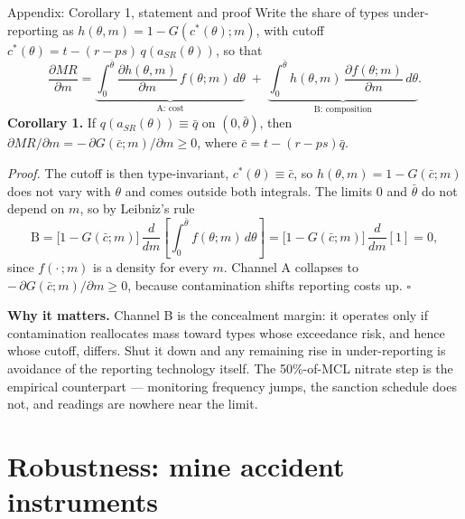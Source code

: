 \documentclass{beamer}
\begin{document}
\begin{frame}{Appendix: Corollary 1, statement and proof}
\scriptsize
Write the share of types under-reporting as $h(\theta,m) = 1 - G(c^*(\theta);m)$, with cutoff $c^*(\theta) = t - (r-ps)\,q(a_{SR}(\theta))$, so that
\[
\frac{\partial MR}{\partial m} = \underbrace{\int_0^{\bar\theta}\!\frac{\partial h(\theta,m)}{\partial m}\,f(\theta;m)\,d\theta}_{\text{A: cost}} \;+\; \underbrace{\int_0^{\bar\theta}\! h(\theta,m)\,\frac{\partial f(\theta;m)}{\partial m}\,d\theta}_{\text{B: composition}}.
\]
\textbf{Corollary 1.} If $q(a_{SR}(\theta)) \equiv \bar q$ on $(0,\bar\theta)$, then $\partial MR/\partial m = -\,\partial G(\bar c;m)/\partial m \ge 0$, where $\bar c = t-(r-ps)\bar q$.
\smallskip

\textit{Proof.} The cutoff is then type-invariant, $c^*(\theta) \equiv \bar c$, so $h(\theta,m) = 1-G(\bar c;m)$ does not vary with $\theta$ and comes outside both integrals. The limits $0$ and $\bar\theta$ do not depend on $m$, so by Leibniz's rule
\[
\text{B} = \big[1-G(\bar c;m)\big]\,\frac{d}{dm}\!\left[\int_0^{\bar\theta}\! f(\theta;m)\,d\theta\right] = \big[1-G(\bar c;m)\big]\,\frac{d}{dm}[1] = 0,
\]
since $f(\cdot\,;m)$ is a density for every $m$. Channel A collapses to $-\,\partial G(\bar c;m)/\partial m \ge 0$, because contamination shifts reporting costs up. $\square$
\smallskip

\textbf{Why it matters.} Channel B is the concealment margin: it operates only if contamination reallocates mass toward types whose exceedance risk, and hence whose cutoff, differs. Shut it down and any remaining rise in under-reporting is avoidance of the reporting technology itself. The 50\%-of-MCL nitrate step is the empirical counterpart --- monitoring frequency jumps, the sanction schedule does not, and readings are nowhere near the limit.
\end{frame}

\section{Robustness: mine accident instruments}
\end{document}
